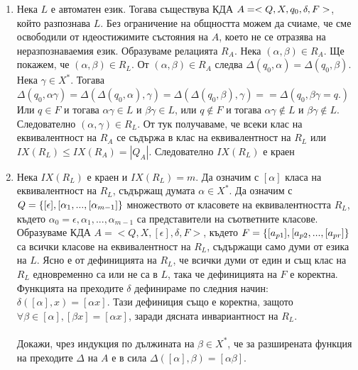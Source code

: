 \documentclass[11pt]{article} %
\begin{document}
\proof
\renewcommand{\theenumi}{\arabic{enumi}}
\begin{enumerate}
	\item Нека $L$ е автоматен език. Тогава съществува КДА $A = <Q, X, q_{0}, \delta, F>$, който разпознава $L$. Без ограничение на общността можем да счиаме, че сме освободили от ндеостижимите състояния на $A$, което не се отразява на неразпознаваемия език. Образуваме релацията $R_{A}$. Нека $(\alpha, \beta) \in R_{A}$. Ще покажем, че $(\alpha, \beta) \in R_{L}$. От $(\alpha, \beta) \in R_{A}$ следва $\Delta(q_{0}, \alpha) = \Delta(q_{0}, \beta).$ Нека $\gamma \in X^{*}$. Тогава $\Delta(q_{0}, \alpha \gamma) = \Delta(\Delta(q_{0}, \alpha), \gamma)
	= \Delta(\Delta(q_{0}, \beta), \gamma) = = \Delta(q_{0}, \beta \gamma = q.)$
	Или $q \in F$ и тогава $\alpha \gamma \in L$ и $\beta \gamma \in L$, или $q \notin F$ и тогава $\alpha \gamma \notin L$ и $\beta \gamma \notin L$.
	Следователно $(\alpha, \gamma) \in R_{L}$. От тук получаваме, че всеки клас на еквивалентност на $R_{A}$ се съдържа в клас на еквивалентност на $R_{L}$ или $IX(R_{L}) \leq IX(R_{A}) = |Q_{A}|$. Следователно $IX(R_{L})$ е краен
	\item Нека $IX(R_{L})$ е краен и $IX(R_{L}) = m$. Да означим с $[\alpha]$ класа на еквивалентност на $R_{L}$, съдържащ думата $\alpha \in X^{*}$. 
	Да означим с $Q = \{[\epsilon], [\alpha_{1}, ... , [\alpha_{m-1}]\}$ множеството от класовете на еквивалентността $R_{L}$, където $\alpha_{0} = \epsilon, \alpha_{1}, ..., \alpha_{m-1}$ са представители на съответните класове.
	 Образуваме КДА $A = < Q, X, [\epsilon], \delta, F >$, където $F = \{[a_{p1}], [a_{p2},...,[a_{pr}]\}$ са всички класове на еквивалентност на $R_{L}$, съдържащи само думи от езика на $L$. Ясно е от дефиницията на $R_{L}$, че всички думи от един и същ клас на $R_{L}$ едновременно са или не са в $L$, така че дефиницията на $F$ е коректна. 
	 Функцията на преходите $\delta$ дефинираме по следния начин: $\delta([\alpha], x) = [\alpha x]$. Тази дефиниция също е коректна, защото $\forall \beta \in [\alpha], [\beta x] = [\alpha x]$, заради дясната инвариантност на $R_{L}$.
	 \\ \\
	 {Докажи, чрез индукция по дължината на $\beta \in X^{*}$, че за разширената функция на преходите $\Delta$ на $A$ е в сила $\Delta([\alpha], \beta) = [\alpha \beta]$}.
	 \\ \\ 
\end{enumerate} \par
\end{document}
